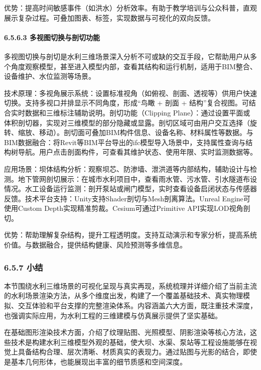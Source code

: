 优势：提高时间敏感事件（如洪水）分析效率。有助于教学培训与公众科普，直观展示复杂过程。可叠加图表、标签，实现数据与可视化的双向反馈。

\paragraph{6.5.6.3 多视图切换与剖切功能}\label{ux591aux89c6ux56feux5207ux6362ux4e0eux5256ux5207ux529fux80fd}

多视图切换与剖切是水利三维场景深入分析不可或缺的交互手段，它帮助用户从多个角度观察模型，甚至进入模型内部，查看其结构和运行机制，适用于BIM整合、设备维护、水位监测等场景。

技术原理：多视角展示系统：设置标准视角（如俯视、剖面、透视等）供用户快速切换。支持多视口并排显示不同角度，形成``鸟瞰 + 剖面 + 结构''复合视图。可结合实时数据和三维标注辅助说明。剖切功能（Clipping Plane）：通过设置平面或体积剖切器，实现对三维模型的部分隐藏或显露。剖切区域可由用户交互选择（旋转、缩放、移动）。剖切面可叠加BIM构件信息、设备名称、材料属性等数据。与BIM数据融合：将Revit等BIM平台导出的ifc模型导入场景中，支持属性查询与结构树导航。用户点击剖面构件，可查看其维护状态、使用年限、实时监测数据等。

应用场景：坝体结构分析：观察坝芯、防渗墙、泄洪道等内部结构，辅助设计与检测。地下管网剖切展示：在城市水利项目中，查看雨水管、污水管、引水隧道布设情况。水工设备运行监测：剖开泵站或闸门模型，实时查看设备启闭状态与传感器反馈。技术平台支持：Unity支持Shader剖切与Mesh剖离算法。Unreal Engine可使用Custom Depth实现精准剪裁。Cesium可通过Primitive API实现LOD视角剖切。

优势：帮助理解复杂结构，提升工程透明度。支持互动演示和专家分析，提高系统价值。与数据融合，提供结构健康、风险预测等多维信息。

\subsubsection{6.5.7 小结}\label{ux5c0fux7ed3-4}

本节围绕水利三维场景的可视化呈现与真实再现，系统梳理并详细介绍了当前主流的水利场景渲染方法，从多个维度出发，构建了一个覆盖基础技术、真实物理模拟、交互体验和平台支撑的完整渲染体系。内容涵盖六大方面，既注重技术深度，也强调实际应用，为水利工程的三维建模与仿真展示提供了坚实基础。

在基础图形渲染技术方面，介绍了纹理贴图、光照模型、阴影渲染等核心方法，这些技术是构建水利三维模型外观的基础，使大坝、水渠、泵站等工程设施能够在视觉上具备结构合理、层次清晰、材质真实的表现力。通过贴图与光影的结合，即使是基本几何形体，也能展现出丰富的细节质感和空间深度。

